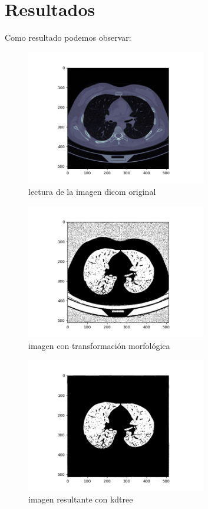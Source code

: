 \documentclass{article}
\begin{document}
	\section{Resultados}
Como resultado podemos observar:
\begin{figure}[H]
\centering
\includegraphics[width=0.7\textwidth]{img/image01.png}
\caption{lectura de la imagen dicom original}
\end{figure}

\begin{figure}[H]
\centering
\includegraphics[width=0.7\textwidth]{img/image02.png}
\caption{imagen con transformación morfológica }
\end{figure}

\begin{figure}[H]
\centering
\includegraphics[width=0.7\textwidth]{img/image03.png}
\caption{imagen resultante con kdtree}
\end{figure}
\end{document}
